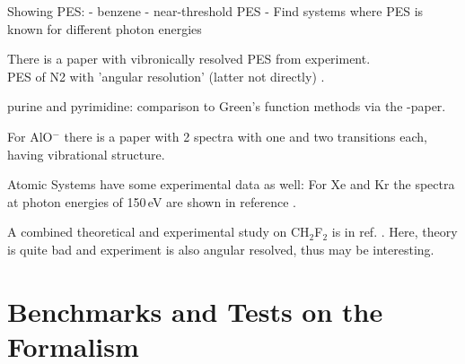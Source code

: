 Showing PES:
 - benzene
 - near-threshold PES
 - Find systems where PES is known for different photon energies

There is a paper\cite{vibPES} with vibronically resolved PES from experiment.\\
PES of N2 with 'angular resolution' (latter not directly) \cite{PESN2}.

purine and pyrimidine: comparison to Green's function methods via the \cite{PottsHolland}-paper.

For AlO$^-$ there is a paper with 2 spectra with one and two transitions each, having vibrational
structure\cite{AlO}.

Atomic Systems have some experimental data as well: For Xe and Kr the spectra at photon energies of 150$\,$eV are shown in reference \cite{KrXe}.

A combined theoretical and experimental study on CH$_2$F$_2$ is in ref. \cite{ch2f2}. Here, theory is quite bad and experiment is also angular resolved, thus may be interesting.

\section{Benchmarks and Tests on the Formalism}
